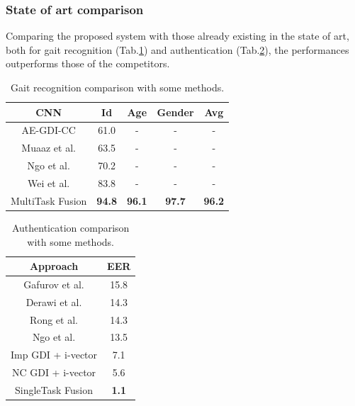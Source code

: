 \subsubsection{State of art comparison}
Comparing the proposed system with those already existing in the state of 
art, both for gait recognition (Tab.\ref{Gait comparison}) and authentication (Tab.\ref{Authentication comparison}), the 
performances outperforms those of the competitors.
\begin{table}[h!]
    \centering
    \begin{adjustbox}{max width=\textwidth}
    \begin{tabular}{|c|ccc|c|}
        \hline
        CNN & Id & Age & Gender & Avg\\
        \hline
        AE-GDI-CC & 61.0 & - & - & -\\
        Muaaz et al. & 63.5 & - & - & -\\
        Ngo et al. & 70.2 & - & - & -\\
        Wei et al. & 83.8 & - & - & - \\
        \hline
        MultiTask Fusion & \bfseries{94.8} & \bfseries{96.1} & \bfseries{97.7} & \bfseries{96.2}\\
        \hline
    \end{tabular}
    \end{adjustbox}
    \caption{Gait recognition comparison with some methods.}
    \label{Gait comparison}
\end{table}

\begin{table}[h!]
    \centering
    \begin{adjustbox}{max width=\textwidth}
    \begin{tabular}{|c|c|}
        \hline
        Approach & EER\\
        \hline
        Gafurov et al. & 15.8 \\
        Derawi et al. & 14.3 \\
        Rong et al. & 14.3 \\
        Ngo et al. & 13.5 \\
        Imp GDI + i-vector & 7.1 \\
        NC GDI + i-vector & 5.6 \\
        \hline
        SingleTask Fusion & \bfseries{1.1}\\
        \hline
    \end{tabular}
    \end{adjustbox}
    \caption{Authentication comparison with some methods.}
    \label{Authentication comparison}
\end{table}

